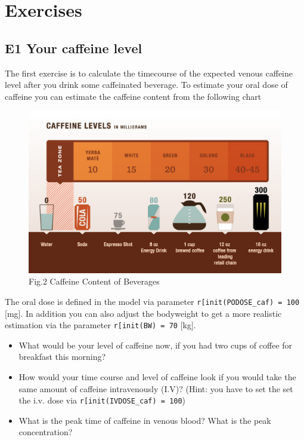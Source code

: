 \documentclass[11pt]{article}
\makeatletter
\def\maxwidth{\ifdim\Gin@nat@width>\linewidth\linewidth
    \else\Gin@nat@width\fi}
\let\Oldincludegraphics\includegraphics
\renewcommand{\includegraphics}[1]{\Oldincludegraphics[width=.8\maxwidth]{#1}}
\providecommand{\tightlist}{%
      \setlength{\itemsep}{0pt}\setlength{\parskip}{0pt}}
\makeatother
\begin{document}
    \section{Exercises}\label{exercises}

\subsection{E1 Your caffeine level}\label{e1-your-caffeine-level}

The first exercise is to calculate the timecourse of the expected venous
caffeine level after you drink some caffeinated beverage. To estimate
your oral dose of caffeine you can estimate the caffeine content from
the following chart

\begin{figure}[htbp]
\centering
\includegraphics{figures/caffeine_levels.jpg}
\caption{Fig.2 Caffeine Content of Beverages}
\end{figure}

The oral dose is defined in the model via parameter
\texttt{r{[}\textquotesingle{}init(PODOSE\_caf)\textquotesingle{}{]}\ =\ 100}
{[}mg{]}. In addition you can also adjust the bodyweight to get a more
realistic estimation via the parameter
\texttt{r{[}\textquotesingle{}init(BW)\textquotesingle{}{]}\ =\ 70}
{[}kg{]}.

\begin{itemize}
\tightlist
\item
  What would be your level of caffeine now, if you had two cups of
  coffee for breakfast this morning?
\item
  How would your time course and level of caffeine look if you would
  take the same amount of caffeine intravenously (I.V)? (Hint: you have
  to set the set the i.v. dose via
  \texttt{r{[}\textquotesingle{}init(IVDOSE\_caf)\textquotesingle{}{]}\ =\ 100})
\item
  What is the peak time of caffeine in venous blood? What is the peak
  concentration?
\end{itemize}
\end{document}
